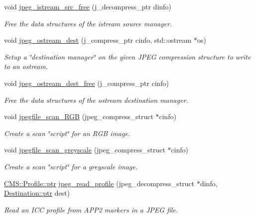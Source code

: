 \begin{DoxyCompactItemize}
void \hyperlink{namespace_photo_finish_aca76b52b734af33c592f35e545811952}{jpeg\+\_\+istream\+\_\+src\+\_\+free} (j\+\_\+decompress\+\_\+ptr dinfo)
\begin{DoxyCompactList}\small\item\em Free the data structures of the istream source manager. \end{DoxyCompactList}\item 
void \hyperlink{namespace_photo_finish_a8d7e2916997da593705b47a56cf33ea2}{jpeg\+\_\+ostream\+\_\+dest} (j\+\_\+compress\+\_\+ptr cinfo, std\+::ostream $\ast$os)
\begin{DoxyCompactList}\small\item\em Setup a \char`\"{}destination manager\char`\"{} on the given J\+P\+EG compression structure to write to an ostream. \end{DoxyCompactList}\item 
void \hyperlink{namespace_photo_finish_a83c709bef3546d9271d51694a7bdbbab}{jpeg\+\_\+ostream\+\_\+dest\+\_\+free} (j\+\_\+compress\+\_\+ptr cinfo)
\begin{DoxyCompactList}\small\item\em Free the data structures of the ostream destination manager. \end{DoxyCompactList}\item 
void \hyperlink{namespace_photo_finish_a790e2181f2d498b2d37bf662d4d39fe1}{jpegfile\+\_\+scan\+\_\+\+R\+GB} (jpeg\+\_\+compress\+\_\+struct $\ast$cinfo)
\begin{DoxyCompactList}\small\item\em Create a scan \char`\"{}script\char`\"{} for an R\+GB image. \end{DoxyCompactList}\item 
void \hyperlink{namespace_photo_finish_aeb3ed185a3672cf727f112889c7320d5}{jpegfile\+\_\+scan\+\_\+greyscale} (jpeg\+\_\+compress\+\_\+struct $\ast$cinfo)
\begin{DoxyCompactList}\small\item\em Create a scan \char`\"{}script\char`\"{} for a greyscale image. \end{DoxyCompactList}\item 
\hyperlink{class_c_m_s_1_1_profile_a7d5a80e1317d17dbfdf5ae69820ab08b}{C\+M\+S\+::\+Profile\+::ptr} \hyperlink{namespace_photo_finish_a646def5a531d0c79b58c5a8ca485837b}{jpeg\+\_\+read\+\_\+profile} (jpeg\+\_\+decompress\+\_\+struct $\ast$dinfo, \hyperlink{class_photo_finish_1_1_destination_a0d282a905cd81c3f0e6d7233c9bc7774}{Destination\+::ptr} dest)
\begin{DoxyCompactList}\small\item\em Read an I\+CC profile from A\+P\+P2 markers in a J\+P\+EG file. \end{DoxyCompactList}\item 

\end{DoxyCompactItemize}
